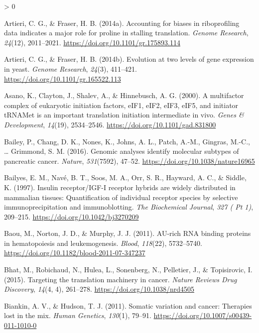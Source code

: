 \documentclass[
  12pt,
  openany]{book}
\newlength{\cslhangindent}
\newenvironment{CSLReferences}[2] %
 {%
  \setlength{\parindent}{0pt}
  \ifodd #1 \everypar{\setlength{\hangindent}{\cslhangindent}}\ignorespaces\fi
  \ifnum #2 > 0
  \setlength{\parskip}{#2\baselineskip}
  \fi
 }%
 {}
\begin{document}
\begin{CSLReferences}{1}{0}
\leavevmode\hypertarget{ref-Artieri2014a}{}%
Artieri, C. G., \& Fraser, H. B. (2014a). Accounting for biases in riboprofiling data indicates a major role for proline in stalling translation. \emph{Genome Research}, \emph{24}(12), 2011--2021. \url{https://doi.org/10.1101/gr.175893.114}

\leavevmode\hypertarget{ref-Artieri2014}{}%
Artieri, C. G., \& Fraser, H. B. (2014b). Evolution at two levels of gene expression in yeast. \emph{Genome Research}, \emph{24}(3), 411--421. \url{https://doi.org/10.1101/gr.165522.113}

\leavevmode\hypertarget{ref-Asano2000}{}%
Asano, K., Clayton, J., Shalev, A., \& Hinnebusch, A. G. (2000). A multifactor complex of eukaryotic initiation factors, {eIF1}, {eIF2}, {eIF3}, {eIF5}, and initiator {tRNAMet} is an important translation initiation intermediate in vivo. \emph{Genes \& Development}, \emph{14}(19), 2534--2546. \url{https://doi.org/10.1101/gad.831800}

\leavevmode\hypertarget{ref-Bailey2016}{}%
Bailey, P., Chang, D. K., Nones, K., Johns, A. L., Patch, A.-M., Gingras, M.-C., \ldots{} Grimmond, S. M. (2016). Genomic analyses identify molecular subtypes of pancreatic cancer. \emph{Nature}, \emph{531}(7592), 47--52. \url{https://doi.org/10.1038/nature16965}

\leavevmode\hypertarget{ref-Bailyes1997}{}%
Bailyes, E. M., Navé, B. T., Soos, M. A., Orr, S. R., Hayward, A. C., \& Siddle, K. (1997). Insulin receptor/{IGF}-{I} receptor hybrids are widely distributed in mammalian tissues: Quantification of individual receptor species by selective immunoprecipitation and immunoblotting. \emph{The Biochemical Journal}, \emph{327 ( Pt 1)}, 209--215. \url{https://doi.org/10.1042/bj3270209}

\leavevmode\hypertarget{ref-Baou2011}{}%
Baou, M., Norton, J. D., \& Murphy, J. J. (2011). {AU}-rich {RNA} binding proteins in hematopoiesis and leukemogenesis. \emph{Blood}, \emph{118}(22), 5732--5740. \url{https://doi.org/10.1182/blood-2011-07-347237}

\leavevmode\hypertarget{ref-Bhat2015}{}%
Bhat, M., Robichaud, N., Hulea, L., Sonenberg, N., Pelletier, J., \& Topisirovic, I. (2015). Targeting the translation machinery in cancer. \emph{Nature Reviews Drug Discovery}, \emph{14}(4, 4), 261--278. \url{https://doi.org/10.1038/nrd4505}

\leavevmode\hypertarget{ref-Biankin2011}{}%
Biankin, A. V., \& Hudson, T. J. (2011). Somatic variation and cancer: Therapies lost in the mix. \emph{Human Genetics}, \emph{130}(1), 79--91. \url{https://doi.org/10.1007/s00439-011-1010-0}


\end{CSLReferences}
\end{document}
